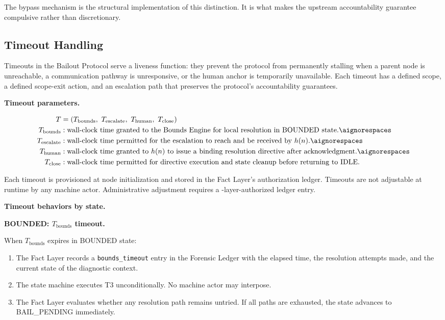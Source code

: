 The bypass mechanism is the structural implementation of this distinction. It is what makes the upstream accountability guarantee compulsive rather than discretionary.

\subsection{Timeout Handling}\label{sec:timeout-handling}

Timeouts in the Bailout Protocol serve a liveness function: they prevent the protocol from permanently stalling when a parent node is unreachable, a communication pathway is unresponsive, or the human anchor is temporarily unavailable. Each timeout has a defined scope, a defined scope-exit action, and an escalation path that preserves the protocol's accountability guarantees.

\bigskip
\noindent\textbf{Timeout parameters.}

\begin{align}
T &= (T_{\text{bounds}},\ T_{\text{escalate}},\ T_{\text{human}},\ T_{\text{close}}) \\
T_{\text{bounds}} &: \text{wall-clock time granted to the Bounds Engine for local resolution in BOUNDED state.} \aignorespaces \\
T_{\text{escalate}} &: \text{wall-clock time permitted for the escalation to reach and be received by } h(n). \aignorespaces \\
T_{\text{human}} &: \text{wall-clock time granted to } h(n) \text{ to issue a binding resolution directive after acknowledgment.} \aignorespaces \\
T_{\text{close}} &: \text{wall-clock time permitted for directive execution and state cleanup before returning to IDLE.}
\end{align}

Each timeout is provisioned at node initialization and stored in the Fact Layer's authorization ledger. Timeouts are not adjustable at runtime by any machine actor. Administrative adjustment requires a \purpose-layer-authorized ledger entry.

\bigskip
\noindent\textbf{Timeout behaviors by state.}

\bigskip
\noindent\textbf{BOUNDED: $T_{\text{bounds}}$ timeout.}

When $T_{\text{bounds}}$ expires in BOUNDED state:
\begin{enumerate}\itemsep=0pt
\item The Fact Layer records a \texttt{bounds\_timeout} entry in the Forensic Ledger with the elapsed time, the resolution attempts made, and the current state of the diagnostic context.
\item The state machine executes T3 unconditionally. No machine actor may interpose.
\item The Fact Layer evaluates whether any resolution path remains untried. If all paths are exhausted, the state advances to BAIL\_PENDING immediately.
\end{enumerate}

